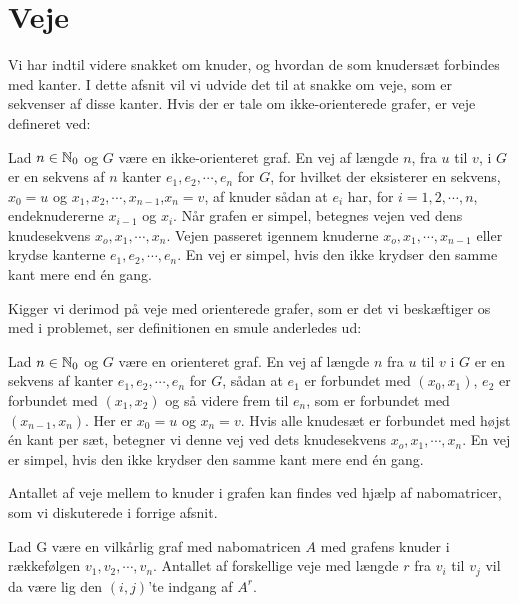 	\section{Veje}
Vi har indtil videre snakket om knuder, og hvordan de som knudersæt forbindes med kanter. I dette afsnit vil vi udvide det til at snakke om veje, som er sekvenser af disse kanter. Hvis der er tale om ikke-orienterede grafer, er veje defineret ved:
\begin{defn}
[Veje] 
Lad $n \in \mathbb{N} _0$  og $G$ være en ikke-orienteret graf. En vej af længde $n$, fra $u$ til $v$, i $G$ er en sekvens af $n$ kanter $e_{1},e_{2},\cdots,e_{n}$ for $G$, for hvilket der eksisterer en sekvens, $x_{0}=u$ og $x_{1},x_{2},\cdots,x_{n-1}$,$x_{n}=v$, af knuder sådan at $e_{i}$ har, for $i=1,2,\cdots,n$, endeknudererne $x_{i-1}$ og $x_{i}$. Når grafen er simpel, betegnes vejen ved dens knudesekvens $x_{o},x_{1},\cdots,x_{n}$. Vejen passeret igennem knuderne $x_{o},x_{1},\cdots,x_{n-1}$ eller krydse kanterne $e_{1},e_{2},\cdots,e_{n}$. En vej er simpel, hvis den ikke krydser den samme kant mere end én gang.
\end{defn}
Kigger vi derimod på veje med orienterede grafer, som er det vi beskæftiger os med i problemet, ser definitionen en smule anderledes ud:
\begin{defn}
[Veje] 
Lad $n \in \mathbb{N} _0$ og $G$ være en orienteret graf. En vej af længde $n$ fra $u$ til $v$ i $G$ er en sekvens af kanter $e_{1},e_{2},\cdots,e_{n}$ for $G$, sådan at $e_{1}$ er forbundet med $(x_{0},x_{1})$, $e_{2}$ er forbundet med $(x_{1},x_{2})$ og så videre frem til $e_{n}$, som er forbundet med $(x_{n-1},x_{n})$. Her er $x_{0}=u$ og $x_{n}=v$. Hvis alle knudesæt er forbundet med højst én kant per sæt, betegner vi denne  vej ved dets knudesekvens $x_{o},x_{1},\cdots,x_{n}$. En vej er simpel, hvis den ikke krydser den samme kant mere end én gang.
\end{defn}



Antallet af veje mellem to knuder i grafen kan findes ved hjælp af nabomatricer, som vi diskuterede i forrige afsnit.
\begin{thm}
Lad G være en vilkårlig graf med nabomatricen
\textbf{$A$} med grafens knuder i rækkefølgen $v_{1},v_{2},\cdots,v_{n}$. Antallet af forskellige veje med længde $r$ fra $v_{i}$ til $v_{j}$ vil da være lig den $(i,j)$'te indgang af \textbf{$A^{r}$}.
\end{thm}

